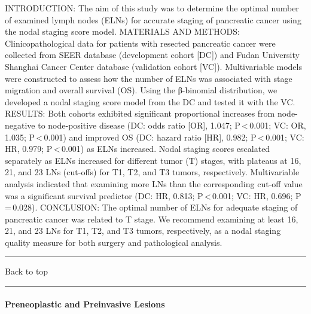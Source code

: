 \documentclass[]{article}
\let\oldparagraph\paragraph
\renewcommand{\paragraph}[1]{\oldparagraph{#1}\mbox{}}
\begin{document}
INTRODUCTION: The aim of this study was to determine the optimal number
of examined lymph nodes (ELNs) for accurate staging of pancreatic cancer
using the nodal staging score model. MATERIALS AND METHODS:
Clinicopathological data for patients with resected pancreatic cancer
were collected from SEER database (development cohort {[}DC{]}) and
Fudan University Shanghai Cancer Center database (validation cohort
{[}VC{]}). Multivariable models were constructed to assess how the
number of ELNs was associated with stage migration and overall survival
(OS). Using the β-binomial distribution, we developed a nodal staging
score model from the DC and tested it with the VC. RESULTS: Both cohorts
exhibited significant proportional increases from node-negative to
node-positive disease (DC: odds ratio {[}OR{]}, 1.047;
P\,\textless{}\,0.001; VC: OR, 1.035; P\,\textless{}\,0.001) and
improved OS (DC: hazard ratio {[}HR{]}, 0.982; P\,\textless{}\,0.001;
VC: HR, 0.979; P\,\textless{}\,0.001) as ELNs increased. Nodal staging
scores escalated separately as ELNs increased for different tumor (T)
stages, with plateaus at 16, 21, and 23 LNs (cut-offs) for T1, T2, and
T3 tumors, respectively. Multivariable analysis indicated that examining
more LNs than the corresponding cut-off value was a significant survival
predictor (DC: HR, 0.813; P\,\textless{}\,0.001; VC: HR, 0.696;
P\,=\,0.028). CONCLUSION: The optimal number of ELNs for adequate
staging of pancreatic cancer was related to T stage. We recommend
examining at least 16, 21, and 23 LNs for T1, T2, and T3 tumors,
respectively, as a nodal staging quality measure for both surgery and
pathological analysis.

{}

{}

\begin{center}\rule{0.5\linewidth}{\linethickness}\end{center}

Back to top

\begin{center}\rule{0.5\linewidth}{\linethickness}\end{center}

\pagebreak

\hypertarget{preneoplastic-and-preinvasive-lesions}{%
\paragraph{Preneoplastic and Preinvasive
Lesions}\label{preneoplastic-and-preinvasive-lesions}}
\end{document}
